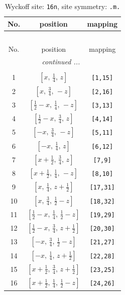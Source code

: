 \documentclass[fleqn,8pt]{jsarticle}
\begin{document}
\renewcommand{\arraystretch}{1.2}
\begin{longtable}{ccc}
\caption{Wyckoff site: {\tt 16n}, site symmetry: {\tt .m.}}
 \\
 \hline \hline
No. & position & mapping \\ \hline \endfirsthead

\multicolumn{2}{l}{\tablename\ \thetable{}} \\
 \hline \hline
No. & position & mapping \\ \hline \endhead

 \hline \hline
\multicolumn{2}{r}{\footnotesize\it continued ...} \\ \endfoot

 \hline \hline
\multicolumn{2}{r}{} \\ \endlastfoot

1 & $\left[ x,\, \frac{1}{4},\, z \right]$ & {\tt [1,15]} \\ \hline
2 & $\left[ x,\, \frac{3}{4},\, - z \right]$ & {\tt [2,16]} \\ \hline
3 & $\left[ \frac{1}{2} - x,\, \frac{1}{4},\, - z \right]$ & {\tt [3,13]} \\ \hline
4 & $\left[ \frac{1}{2} - x,\, \frac{3}{4},\, z \right]$ & {\tt [4,14]} \\ \hline
5 & $\left[ - x,\, \frac{3}{4},\, - z \right]$ & {\tt [5,11]} \\ \hline
6 & $\left[ - x,\, \frac{1}{4},\, z \right]$ & {\tt [6,12]} \\ \hline
7 & $\left[ x + \frac{1}{2},\, \frac{3}{4},\, z \right]$ & {\tt [7,9]} \\ \hline
8 & $\left[ x + \frac{1}{2},\, \frac{1}{4},\, - z \right]$ & {\tt [8,10]} \\ \hline
9 & $\left[ x,\, \frac{1}{4},\, z + \frac{1}{2} \right]$ & {\tt [17,31]} \\ \hline
10 & $\left[ x,\, \frac{3}{4},\, \frac{1}{2} - z \right]$ & {\tt [18,32]} \\ \hline
11 & $\left[ \frac{1}{2} - x,\, \frac{1}{4},\, \frac{1}{2} - z \right]$ & {\tt [19,29]} \\ \hline
12 & $\left[ \frac{1}{2} - x,\, \frac{3}{4},\, z + \frac{1}{2} \right]$ & {\tt [20,30]} \\ \hline
13 & $\left[ - x,\, \frac{3}{4},\, \frac{1}{2} - z \right]$ & {\tt [21,27]} \\ \hline
14 & $\left[ - x,\, \frac{1}{4},\, z + \frac{1}{2} \right]$ & {\tt [22,28]} \\ \hline
15 & $\left[ x + \frac{1}{2},\, \frac{3}{4},\, z + \frac{1}{2} \right]$ & {\tt [23,25]} \\ \hline
16 & $\left[ x + \frac{1}{2},\, \frac{1}{4},\, \frac{1}{2} - z \right]$ & {\tt [24,26]} \\
\end{longtable}
\end{document}
